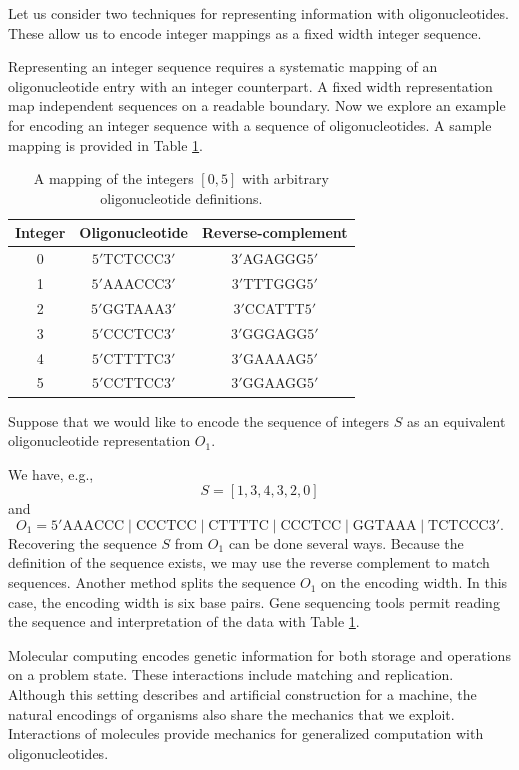 Let us consider two techniques for representing information with oligonucleotides.  These allow us to encode integer mappings as a fixed width integer sequence.

Representing an integer sequence requires a systematic mapping of an oligonucleotide entry with an integer counterpart.  A fixed width representation map independent sequences on a readable boundary.  Now we explore an example for encoding an integer sequence with a sequence of oligonucleotides.  A sample mapping is provided in Table \ref{integer2OligoTable}.

\begin{table}[htdp]
\caption{A mapping of the integers $[0,5]$ with arbitrary oligonucleotide definitions.}
\begin{center}
\begin{tabular}{|c|c|c|}
\hline
 \textbf{Integer} & \textbf{Oligonucleotide} & \textbf{Reverse-complement}\\ \hline
0 & $5'$TCTCCC$3'$ & $3'$AGAGGG$5'$ \\
1 & $5'$AAACCC$3'$ & $3'$TTTGGG$5'$ \\
2 & $5'$GGTAAA$3'$ & $3'$CCATTT$5'$ \\
3 & $5'$CCCTCC$3'$ & $3'$GGGAGG$5'$ \\
4 & $5'$CTTTTC$3'$ & $3'$GAAAAG$5'$ \\
5 & $5'$CCTTCC$3'$ & $3'$GGAAGG$5'$ \\ \hline
\end{tabular}
\end{center}
\label{integer2OligoTable}
\end{table}%

Suppose that we would like to encode the sequence of integers $S$ as an equivalent oligonucleotide representation $O_1$.

We have, e.g., 
\[
S = [1, 3, 4, 3, 2, 0]
\]
and 
\[
O_1 = 5'\text{AAACCC}\mid \text{CCCTCC}\mid \text{CTTTTC}\mid \text{CCCTCC}\mid \text{GGTAAA}\mid \text{TCTCCC}3'.
\]
Recovering the sequence $S$ from $O_1$ can be done several ways.  Because the definition of the sequence exists, we may use the reverse complement to match sequences.  Another method splits the sequence $O_1$ on the encoding width.  In this case, the encoding width is six base pairs.  Gene sequencing tools permit reading the sequence and interpretation of the data with Table \ref{integer2OligoTable}.

Molecular computing encodes genetic information for both storage and operations on a problem state.  These interactions include matching and replication.  Although this setting describes and artificial construction for a machine, the natural encodings of organisms also share the mechanics that we exploit.  Interactions of molecules provide mechanics for generalized computation with oligonucleotides.
	
